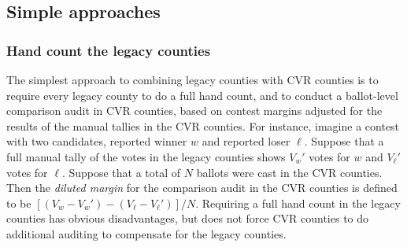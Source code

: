 \documentclass[runningheads]{llncs}
\begin{document}
\subsection{Simple approaches} \label{sec:crude}

\subsubsection{Hand count the legacy counties}
The simplest approach to combining legacy counties with CVR counties is to require every
legacy county to do a full hand count, and to conduct a 
ballot-level comparison audit in CVR counties, based on contest margins adjusted for
the results of the manual tallies in the CVR counties.
For instance, imagine a contest with two candidates, reported winner $w$ and reported loser $\ell$.
Suppose that a full manual tally of the votes in the legacy counties shows $V_w'$ votes for $w$ and
$V_\ell'$ votes for $\ell$.
Suppose that a total of $N$ ballots were cast in the CVR counties.
Then the \emph{diluted margin}  for the comparison audit in the CVR counties is defined to be
$[(V_w-V_w')-(V_\ell-V_\ell')]/N$.
Requiring a full hand count in the legacy counties has obvious disadvantages,
but does not force CVR counties to do additional auditing to compensate for the legacy counties.
\end{document}
